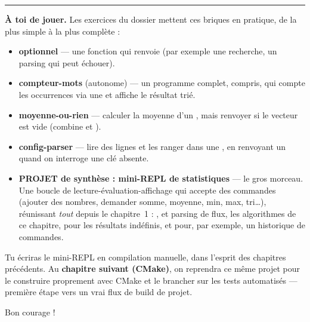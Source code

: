 \documentclass[11pt]{article}
\begin{document}
\bigskip\hrule\bigskip
\noindent\textbf{À toi de jouer.} Les exercices du dossier 
mettent ces briques en pratique, de la plus simple à la plus complète :

\begin{itemize}[noitemsep]
    \item \textbf{optionnel} — une fonction qui renvoie 
          (par exemple une recherche, un parsing qui peut échouer).
    \item \textbf{compteur-mots} (autonome) — un programme complet,
           compris, qui compte les occurrences via une
           et affiche le résultat trié.
    \item \textbf{moyenne-ou-rien} — calculer la moyenne d'un ,
          mais renvoyer  si le vecteur est vide (combine
           et ).
    \item \textbf{config-parser} — lire des lignes  et les
          ranger dans une , en renvoyant un  quand
          on interroge une clé absente.
    \item \textbf{PROJET de synthèse : mini-REPL de statistiques} — le gros
          morceau. Une boucle de lecture-évaluation-affichage qui accepte des
          commandes (ajouter des nombres, demander somme, moyenne, min, max,
          tri\ldots), réunissant \emph{tout} depuis le chapitre~1 :
          ,  et parsing de flux, les
          algorithmes de ce chapitre,  pour les résultats
          indéfinis, et  pour, par exemple, un historique de
          commandes.
\end{itemize}

\begin{aretenir}
Tu écriras le mini-REPL en compilation manuelle, dans l'esprit des chapitres
précédents. Au \textbf{chapitre suivant (CMake)}, on reprendra ce même projet
pour le construire proprement avec CMake et le brancher sur les tests
automatisés — première étape vers un vrai flux de build de projet.
\end{aretenir}

\noindent Bon courage !
\end{document}
